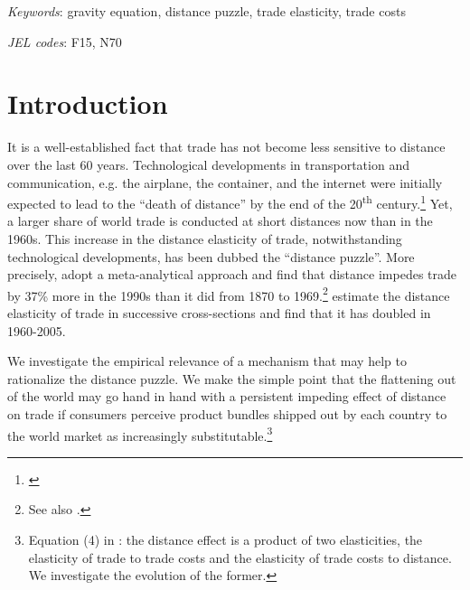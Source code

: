 \documentclass[12pt,twoside,a4paper,notitlepage]{article}
\begin{document}
\textit{Keywords}: gravity equation, distance puzzle, trade elasticity, trade costs

\textit{JEL codes}: F15, N70
\clearpage

\section*{Introduction}

It is a well-established fact that trade has not become less sensitive to distance over the last 60 years.
Technological developments in transportation and communication, e.g. the airplane, the container, and the internet were initially expected to lead to the ``death of distance'' by the end of the 20\textsuperscript{th} century.\footnote{\cite{Cairncross1997,Levinson2006,Friedman2007}}
Yet, a larger share of world trade is conducted at short distances now than in the 1960s.
This increase in the distance elasticity of trade, notwithstanding technological developments, has been dubbed the ``distance puzzle''.
More precisely, \cite{Disdier2008} adopt a meta-analytical approach and find that distance impedes trade by 37\% more in the 1990s than it did from 1870 to 1969.\footnote{See also \cite{Berthelon2008,Combes2006, Brun2005, Buch2004}.}
\cite{Head2013} estimate the distance elasticity of trade in successive cross-sections and find that it has doubled in 1960-2005.

We investigate the empirical relevance of a mechanism that may help to rationalize the distance puzzle.
We make the simple point that the flattening out of the world may go hand in hand with a persistent impeding effect of distance on trade if consumers perceive product bundles shipped out by each country to the world market as increasingly substitutable.\footnote{Equation (4) in \cite{Head2013}: the distance effect is a product of two elasticities, the elasticity of trade to trade costs and the elasticity of trade costs to distance.
We investigate the evolution of the former.}
\end{document}
